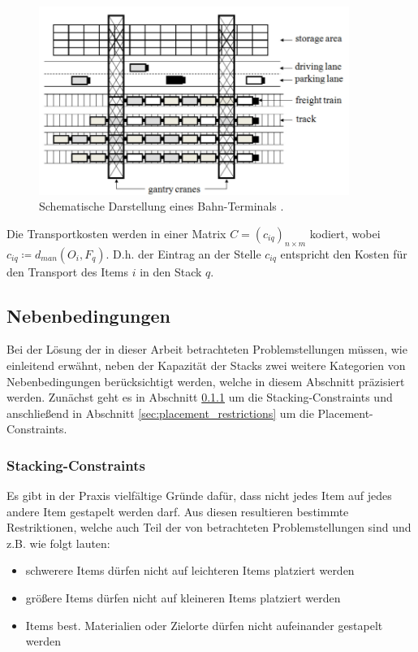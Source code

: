 \begin{figure}[H]
\includegraphics[width=0.9\textwidth]{img/costs.png}
\caption{Schematische Darstellung eines Bahn-Terminals \cite{Briskorn2018}.}
\label{fig:costs}
\end{figure}
Die Transportkosten werden in einer Matrix $C = (c_{iq})_{n \times m}$ kodiert,
wobei $c_{iq} \coloneqq d_{man}(O_i, F_q)$. D.h. der Eintrag an der Stelle $c_{iq}$ entspricht
den Kosten für den Transport des Items $i$ in den Stack $q$.

\pagebreak

\subsection{Nebenbedingungen}
\label{sec:constraints}

Bei der Lösung der in dieser Arbeit betrachteten Problemstellungen müssen, wie einleitend erwähnt,
neben der Kapazität der Stacks zwei weitere Kategorien von Nebenbedingungen berücksichtigt werden, welche in diesem Abschnitt
präzisiert werden. Zunächst geht es in Abschnitt \ref{sec:stacking_restrictions} um die Stacking-Constraints
und anschließend in Abschnitt \ref{sec:placement_restrictions} um die Placement-Constraints.

\subsubsection{Stacking-Constraints}
\label{sec:stacking_restrictions}

Es gibt in der Praxis vielfältige Gründe dafür, dass nicht jedes Item auf jedes andere Item gestapelt werden darf.
Aus diesen resultieren bestimmte Restriktionen, welche auch Teil der von \citet{Bruns2015} betrachteten Problemstellungen
sind und z.B. wie folgt lauten:
\begin{itemize}
  \item schwerere Items dürfen nicht auf leichteren Items platziert werden
  \item größere Items dürfen nicht auf kleineren Items platziert werden
  \item Items best. Materialien oder Zielorte dürfen nicht aufeinander gestapelt werden
\end{itemize}

